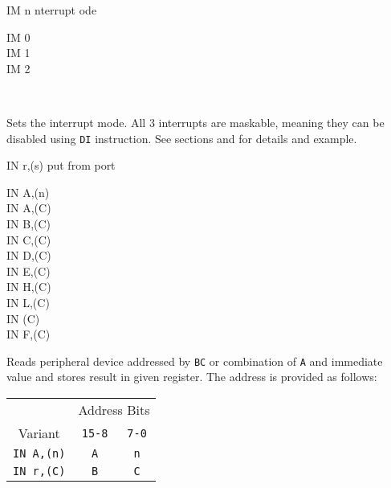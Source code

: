 \begin{basedescript}{
	\desclabelstyle{\multilinelabel}
	\desclabelwidth{3cm}}
	\begin{DetailItem}{IM n}
		{nterrupt ode}
		{}

		\begin{DetailVariants}[2]
			IM 0\\
			IM 1\\
			IM 2
			
			\columnbreak
			~
		\end{DetailVariants}

		Sets the interrupt mode. All 3 interrupts are maskable, meaning they can be disabled using {\tt DI} instruction. See sections  and  for details and example.

		\begin{DetailEffects}
			\FlagsIM		
		\end{DetailEffects}

		\begin{DetailTiming}
		\end{DetailTiming}

	\end{DetailItem}

	\pagebreak
	\begin{DetailItem}{IN r,(s)}
		{put from port}
		{}

		\begin{DetailVariants}
			IN A,(n)\\
			IN A,(C)\\
			IN B,(C)\\
			IN C,(C)\\
			IN D,(C)\\
			IN E,(C)\\
			IN H,(C)\\
			IN L,(C)\\
			IN (C)\UNDOC\\
			IN F,(C)\UNDOC
		\end{DetailVariants}

		Reads peripheral device addressed by {\tt BC} or combination of {\tt A} and immediate value and stores result in given register. The address is provided as follows:

		\begin{tabular}{ccc}
			& \multicolumn{2}{c}{Address Bits} \\
			Variant & {\tt 15-8} & {\tt 7-0} \\
			\hline
			{\tt IN A,(n)} & {\tt A} & {\tt n} \\
			{\tt IN r,(C)} & {\tt B} & {\tt C} \\
		\end{tabular}
		\vspace{1ex} %


\end{DetailItem}
\end{basedescript}
